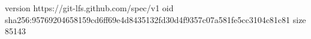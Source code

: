 version https://git-lfs.github.com/spec/v1
oid sha256:95769204658159cd6ff69e4d8435132fd30d4f9357c07a581fe5cc3104c81c81
size 85143
